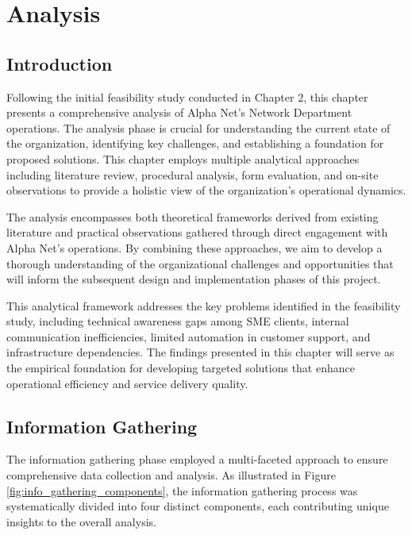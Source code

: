 \chapter{Analysis}

\section{Introduction}
Following the initial feasibility study conducted in Chapter 2, this chapter presents a comprehensive analysis of Alpha Net's Network Department operations. The analysis phase is crucial for understanding the current state of the organization, identifying key challenges, and establishing a foundation for proposed solutions. This chapter employs multiple analytical approaches including literature review, procedural analysis, form evaluation, and on-site observations to provide a holistic view of the organization's operational dynamics.

The analysis encompasses both theoretical frameworks derived from existing literature and practical observations gathered through direct engagement with Alpha Net's operations. By combining these approaches, we aim to develop a thorough understanding of the organizational challenges and opportunities that will inform the subsequent design and implementation phases of this project.

This analytical framework addresses the key problems identified in the feasibility study, including technical awareness gaps among SME clients, internal communication inefficiencies, limited automation in customer support, and infrastructure dependencies. The findings presented in this chapter will serve as the empirical foundation for developing targeted solutions that enhance operational efficiency and service delivery quality.

\section{Information Gathering}

The information gathering phase employed a multi-faceted approach to ensure comprehensive data collection and analysis. As illustrated in Figure \ref{fig:info_gathering_components}, the information gathering process was systematically divided into four distinct components, each contributing unique insights to the overall analysis.

